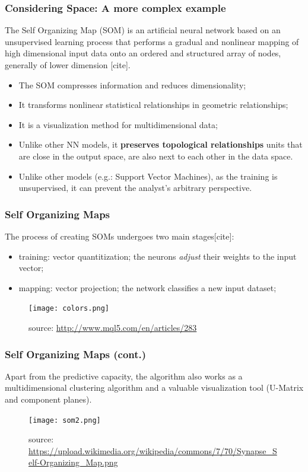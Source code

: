 \documentclass[hyperref={pdfpagelabels=true}]{beamer}
\begin{document}
\begin{frame}
\frametitle{Considering Space: A more complex example}
The Self Organizing Map (SOM) is an artificial neural network based on an unsupervised learning process that performs a gradual and nonlinear mapping of high dimensional input data onto
an ordered and structured array of nodes, generally of lower dimension [cite].
\begin{itemize}
\item <1-> The SOM compresses information and reduces dimensionality;
\item <2-> It transforms nonlinear statistical relationships in geometric relationships;
\item <3-> It is a visualization method for multidimensional data;%
\item <4-> Unlike other NN models, it \textbf{preserves topological relationships} units that are close in the output space, are also next to each other in the data space.%
\item <5-> Unlike other models (e.g.: Support Vector Machines), as the training is unsupervised, it can prevent the analyst's arbitrary perspective.%
\end{itemize}
\end{frame}

\begin{frame}
\frametitle{Self Organizing Maps}
The process of creating SOMs undergoes two main stages[cite]:
\small{
\begin{itemize}
\item <2-> training: vector quantitization; the neurons \textit{adjust} their weights to the input vector;
\item <3-> mapping: vector projection; the network classifies a new input dataset;
\end{itemize}
}
\begin{figure}
\texttt{[image: colors.png]}
\caption{\tiny{source: \url{http://www.mql5.com/en/articles/283}}}
\end{figure}
\end{frame}

\begin{frame}
\frametitle{Self Organizing Maps (cont.)}
\small{Apart from the predictive capacity, the algorithm also works as a multidimensional clustering algorithm and a valuable visualization tool (U-Matrix and component planes).}
\begin{figure}
\texttt{[image: som2.png]}
\caption{\tiny{source: \url{https://upload.wikimedia.org/wikipedia/commons/7/70/Synapse_Self-Organizing_Map.png}}}
\end{figure}
\end{frame}
\end{document}
